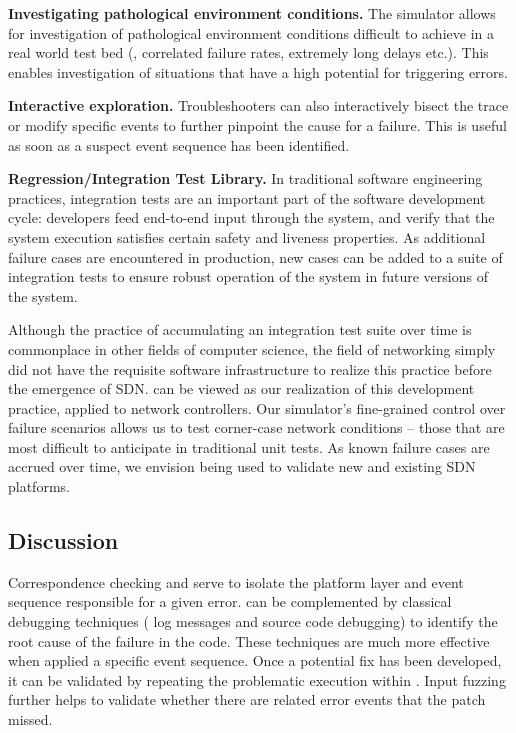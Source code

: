 {\noindent\textbf{Investigating pathological environment conditions.} The simulator allows for investigation
of pathological environment conditions difficult to achieve in a real world test bed
(\eg{}, correlated failure rates, extremely long delays etc.). This enables
investigation of situations that have a high potential for triggering errors.

\noindent\textbf{Interactive exploration.} Troubleshooters can also interactively bisect
the trace or modify specific events to further pinpoint the cause for a failure.
This is useful as soon as a suspect event sequence has been identified.

\noindent\textbf{Regression/Integration Test Library.} In traditional software engineering practices,
integration tests are an
important part of the software development cycle: developers feed end-to-end
input through the system, and verify that the system execution satisfies
certain safety and liveness properties. As additional failure cases are encountered in
production, new cases can be added to a suite of integration tests to
ensure robust operation of the system in future versions of the system.

Although the practice of accumulating an integration test suite over time is
commonplace in other fields of computer science, the field of networking
simply did not have the requisite software infrastructure to realize this practice before the emergence
of SDN. \Simulator{} can be viewed as our realization
of this development practice, applied to network controllers. Our simulator's fine-grained control over
failure scenarios allows us to test corner-case network conditions -- those
that are most difficult to anticipate in traditional unit tests.
As known failure cases are accrued over time, we envision \simulator{} being used to validate
new and existing SDN platforms.

\subsection{Discussion}

Correspondence checking and \simulator{} serve to isolate the platform layer and
event sequence responsible for a given error. \projectname{} can be
complemented by classical debugging techniques (\eg{} log messages and source
code debugging) to identify the root cause of
the failure in the code. These techniques are much more
effective when applied a specific event sequence. Once a
potential fix has been developed, it can be validated by repeating the
problematic execution within \projectname{}. Input fuzzing further helps to
validate whether there are
related error events that the patch missed.

} %


